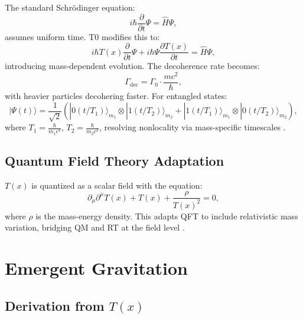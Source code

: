 \documentclass[12pt,a4paper]{article}
\newcommand{\Tfield}{T(x)}
\begin{document}
	The standard Schrödinger equation:
	\begin{equation}
		i\hbar \frac{\partial}{\partial t} \Psi = \hat{H} \Psi,
		\label{eq:standard_schrodinger}
	\end{equation}
	assumes uniform time. T0 modifies this to:
	\begin{equation}
		i\hbar \Tfield \frac{\partial}{\partial t} \Psi + i\hbar \Psi \frac{\partial \Tfield}{\partial t} = \hat{H} \Psi,
		\label{eq:modified_schrodinger}
	\end{equation}
	introducing mass-dependent evolution. The decoherence rate becomes:
	\begin{equation}
		\Gamma_{\text{dec}} = \Gamma_0 \cdot \frac{m c^2}{\hbar},
		\label{eq:decoherence}
	\end{equation}
	with heavier particles decohering faster. For entangled states:
	\begin{equation}
		|\Psi(t)\rangle = \frac{1}{\sqrt{2}}(|0(t/T_1)\rangle_{m_1} \otimes |1(t/T_2)\rangle_{m_2} + |1(t/T_1)\rangle_{m_1} \otimes |0(t/T_2)\rangle_{m_2}),
		\label{eq:entangled_state}
	\end{equation}
	where \(T_1 = \frac{\hbar}{m_1 c^2}\), \(T_2 = \frac{\hbar}{m_2 c^2}\), resolving nonlocality via mass-specific timescales \cite{pascher_photons_2025}.
	
	\subsection{Quantum Field Theory Adaptation}
	\label{subsec:qft_extension}
	
	\(\Tfield\) is quantized as a scalar field with the equation:
	\begin{equation}
		\partial_{\mu}\partial^{\mu}\Tfield + \Tfield + \frac{\rho}{\Tfield^2} = 0,
		\label{eq:field_eq}
	\end{equation}
	where \(\rho\) is the mass-energy density. This adapts QFT to include relativistic mass variation, bridging QM and RT at the field level \cite{pascher_lagrange_2025}.
	
	\section{Emergent Gravitation}
	\label{sec:emergent_grav}
	
	\subsection{Derivation from \(\Tfield\)}
	\label{subsec:grav_derivation}
	
\end{document}
